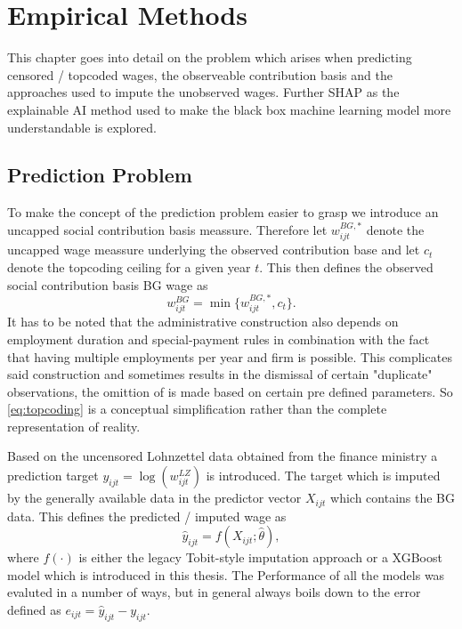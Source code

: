 \documentclass[12pt,a4paper,oneside,titlepage]{book}
\begin{document}
\chapter{Empirical Methods}
\label{ch:methods}
This chapter goes into detail on the problem which arises when predicting censored / topcoded wages, the observeable contribution basis and the approaches used to impute the unobserved wages. Further SHAP as the explainable AI method used to make the black box machine learning model more understandable is explored.

\section{Prediction Problem}
To make the concept of the prediction problem easier to grasp we introduce an uncapped social contribution basis meassure. Therefore let $w^{BG,*}_{ijt}$ denote the uncapped wage meassure underlying the observed contribution base and let $c_t$ denote the topcoding ceiling for a given year $t$. This then defines the observed social contribution basis BG wage as
\begin{equation}
  w^{BG}_{ijt}=\min\{w^{BG,*}_{ijt},c_t\}.
  \label{eq:topcoding}
\end{equation}
It has to be noted that the administrative construction also depends on employment duration and special-payment rules in combination with the fact that having multiple employments per year and firm is possible. This complicates said construction and sometimes results in the dismissal of certain "duplicate" observations, the omittion of is made based on certain pre defined parameters. So \cref{eq:topcoding} is a conceptual simplification rather than the complete representation of reality.

Based on the uncensored Lohnzettel data obtained from the finance ministry a prediction target $y_{ijt}=\log(w^{LZ}_{ijt})$ is introduced. The target which is imputed by the generally available data in the predictor vector $X_{ijt}$ which contains the BG data. This defines the predicted / imputed wage as
\begin{equation}
  \widehat y_{ijt}=f(X_{ijt};\widehat\theta),
\end{equation}
where $f(\cdot)$ is either the legacy Tobit-style imputation approach or a XGBoost model which is introduced in this thesis. The Performance of all the models was evaluted in a number of ways, but in general always boils down to the error defined as $e_{ijt}=\widehat y_{ijt}-y_{ijt}$.
\end{document}
